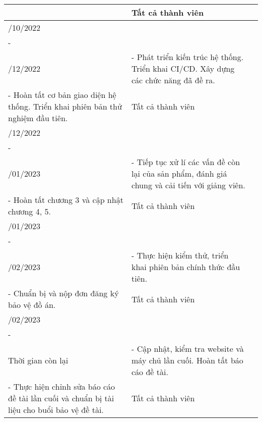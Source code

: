 \begin{tabularx}{\textwidth}{|>{\centering\let\newline
    \\\arraybackslash}X|>{\raggedright\let\newline
    \\\arraybackslash}X|>{\centering\let\newline
    \\\arraybackslash}X|}
     & Tất cả thành viên
    \\
    \hline
    15/10/2022
    \newline
    -
    \newline
    15/12/2022
     & - Phát triển kiến trúc hệ thống. Triển khai CI/CD. Xây dựng các chức năng đã đề ra.
    \newline
    - Hoàn tất cơ bản giao diện hệ thống. Triển khai phiên bản thử nghiệm đầu tiên.
     & Tất cả thành viên
    \\
    \hline
    15/12/2022
    \newline
    -
    \newline
    15/01/2023
     & - Tiếp tục xử lí các vấn đề còn lại của sản phẩm, đánh giá chung và cải tiến với giảng viên.
    \newline
    - Hoàn tất chương 3 và cập nhật chương 4, 5.
     & Tất cả thành viên
    \\
    \hline
    15/01/2023
    \newline
    -
    \newline
    15/02/2023
     & - Thực hiện kiểm thử, triển khai phiên bản chính thức đầu tiên.
    \newline
    - Chuẩn bị và nộp đơn đăng ký bảo vệ đồ án.
     & Tất cả thành viên
    \\
    \hline
    15/02/2023
    \newline
    -
    \newline
    Thời gian còn lại
     & - Cập nhật, kiểm tra website và máy chủ lần cuối. Hoàn tất báo cáo đề tài.
    \newline
    - Thực hiện chỉnh sửa báo cáo đề tài lần cuối và chuẩn bị tài liệu cho buổi bảo vệ đề tài.
     & Tất cả thành viên
    \\
    \hline
\end{tabularx}